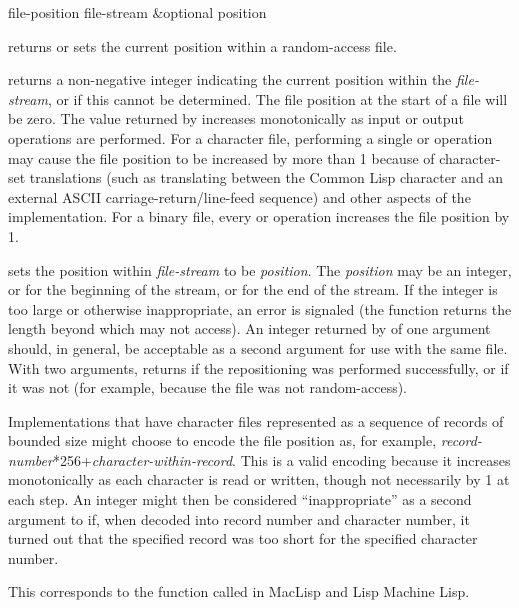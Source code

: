 \begin{defun}[Function]
file-position file-stream &optional position

 returns or sets the current position within
a random-access file.

 returns a non-negative integer
indicating the current position within the \emph{file-stream}, or {\false} if
this cannot be determined.  The file position at the start of a file will
be zero.  The value returned by  increases monotonically
as input or output operations are performed.  For a character file,
performing a single  or  operation
may cause the file position to be increased by more than 1 because of
character-set translations (such as translating between the Common Lisp
 character and an external {ASCII}
carriage-return/line-feed sequence) and other aspects of the
implementation.  For a binary file, every  or 
operation increases the file position by 1.

 sets the position within
\emph{file-stream} to be \emph{position}.  The \emph{position} may be an integer,
or  for the beginning of the stream, or  for the end of the
stream.
If the integer is too large or otherwise inappropriate, an error
is signaled (the  function returns the length beyond
which  may not access).  An integer returned by
 of one argument should, in general, be acceptable
as a second argument for use with the same file.
With two arguments,
 returns {\true} if the repositioning was performed
successfully, or {\false} if it was not (for example,
because the file was not random-access).

\beforenoterule
\begin{implementation}
Implementations that have character files represented
as a sequence of records of bounded size might choose to encode the
file position as, for example,
\emph{record-number}*256+\emph{character-within-record}.
This is a valid encoding because it increases monotonically as
each character is read or written, though not necessarily by 1 at
each step.  An integer might then be considered ``inappropriate''
as a second argument to  if, when decoded into
record number and character number, it turned out that the
specified record was too short for the specified character number.
\end{implementation}
\betweennoterule
\begin{incompatibility}
This corresponds to the function
called  in MacLisp and Lisp Machine Lisp.
\end{incompatibility}
\afternoterule
\end{defun}

